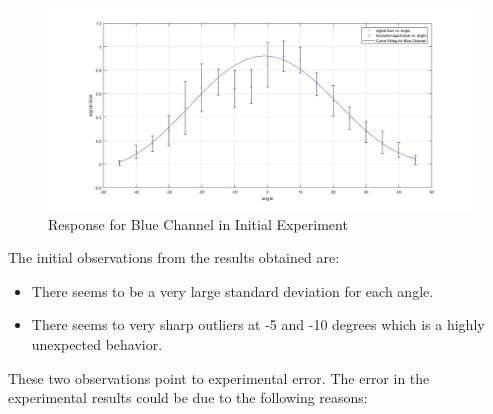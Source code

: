 \begin{figure}[ht]
\centering
\includegraphics[scale=0.25]{pics/BlueChannel.jpg}
\caption{Response for Blue Channel in Initial Experiment}
\label{fig:exp_acc_blu_1}
\end{figure}
The initial observations from the results obtained are:
\begin{itemize}
\item There seems to be a very large standard deviation for each angle.
\item There seems to very sharp outliers at -5 and -10 degrees which is a highly unexpected behavior.
\end{itemize}
These two observations point to experimental error. The error in the experimental results could be due to the following reasons:
